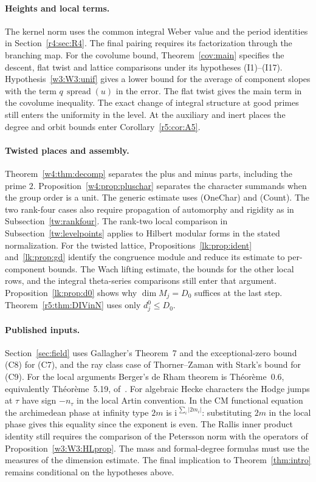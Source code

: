 \paragraph{Heights and local terms.}\label{fr:sec:heights}\label{fr:sec:local}
The kernel norm uses the common integral Weber value and the period
identities in Section~\ref{r4:sec:R4}. The final pairing requires its
factorization through the branching map. For the covolume bound,
Theorem~\ref{cov:main} specifies the descent, flat twist and lattice
comparisons under its hypotheses (I1)--(I17).
Hypothesis~\ref{w3:W3:unif} gives a lower bound for the average of
component slopes with the term $q\,\operatorname{spread}(u)$ in the
error. The flat twist gives the main term in the covolume inequality.
The exact change of integral structure at good primes still enters the
uniformity in the level. At the auxiliary and inert places the degree
and orbit bounds enter Corollary~\ref{r5:cor:A5}.

\paragraph{Twisted places and assembly.}\label{fr:sec:twisted}\label{fr:sec:assembly}
Theorem~\ref{w4:thm:decomp} separates the plus and minus parts, including
the prime $2$. Proposition~\ref{w4:prop:pluschar} separates the character
summands when the group order is a unit. The generic estimate uses
(OneChar) and (Count). The two rank-four cases also require propagation
of automorphy and rigidity as in Subsection~\ref{tw:rankfour}.
The rank-two local comparison in Subsection~\ref{tw:levelpoints} applies
to Hilbert modular forms in the stated normalization.
For the twisted lattice, Propositions~\ref{lk:prop:ident} and~\ref{lk:prop:gd}
identify the congruence module and reduce its estimate to per-component
bounds. The Wach lifting estimate, the bounds for the other local rows,
and the integral theta-series comparisons still enter that argument.
Proposition~\ref{lk:prop:d0} shows why $\dim M_j=D_0$ suffices at the
last step. Theorem~\ref{r5:thm:DIVinN} uses only $d^0_j\le D_0$.

\paragraph{Published inputs.}\label{fr:sec:audit}
Section~\ref{sec:field} uses Gallagher's Theorem~7 and the exceptional-zero
bound (C8) for (C7), and the ray class case of Thorner--Zaman with Stark's
bound for (C9). For the local arguments Berger's de Rham theorem is
Th\'eor\`eme~0.6, equivalently Th\'eor\`eme~5.19, of~\cite{berger02}.
For algebraic Hecke characters the Hodge jumps at $\tau$ have sign
$-n_\tau$ in the local Artin convention. In the CM functional equation
the archimedean phase at infinity type $2m$ is
$\mathrm{i}^{\,\sum_i|2m_i|}$: substituting $2m$ in the local phase gives
this equality since the exponent is even.
The Rallis inner product identity still requires the comparison of the
Petersson norm with the operators of Proposition~\ref{w3:W3:HLprop}.
The mass and formal-degree formulas must use the measures of the
dimension estimate. The final implication to Theorem~\ref{thm:intro}
remains conditional on the hypotheses above.
